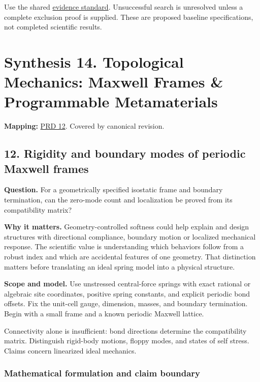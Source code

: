 \documentclass[
  11pt,
]{article}
\begin{document}
Use the shared
\href{https://github.com/rick-stevens-ai/Pure-Thought/blob/main/reviews/EVIDENCE-STANDARD.md}{evidence
standard}. Unsuccessful search is unresolved unless a complete exclusion
proof is supplied. These are proposed baseline specifications, not
completed scientific results.

\section{Synthesis 14. Topological Mechanics: Maxwell Frames \&
Programmable Metamaterials}

\textbf{Mapping:}
\href{https://github.com/rick-stevens-ai/Pure-Thought/blob/main/PRDs/12-Topological-Mechanical-Metamaterials.md}{PRD
12}. Covered by canonical revision.

\subsection{12. Rigidity and boundary modes of periodic Maxwell frames}

\textbf{Question.} For a geometrically specified isostatic frame and
boundary termination, can the zero-mode count and localization be proved
from its compatibility matrix?

\textbf{Why it matters.} Geometry-controlled softness could help explain
and design structures with directional compliance, boundary motion or
localized mechanical response. The scientific value is understanding
which behaviors follow from a robust index and which are accidental
features of one geometry. That distinction matters before translating an
ideal spring model into a physical structure.

\textbf{Scope and model.} Use unstressed central-force springs with
exact rational or algebraic site coordinates, positive spring constants,
and explicit periodic bond offsets. Fix the unit-cell gauge, dimension,
masses, and boundary termination. Begin with a small frame and a known
periodic Maxwell lattice.

Connectivity alone is insufficient: bond directions determine the
compatibility matrix. Distinguish rigid-body motions, floppy modes, and
states of self stress. Claims concern linearized ideal mechanics.

\subsubsection{Mathematical formulation and claim boundary}
\end{document}
